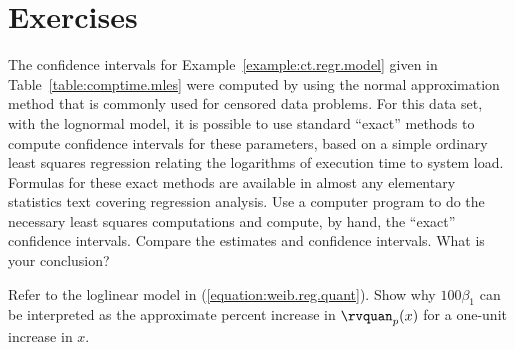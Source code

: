 \section*{Exercises}

\begin{exercise}
The confidence intervals for Example~\ref{example:ct.regr.model} given
in Table~\ref{table:comptime.mles} were computed by using the normal
approximation method that is commonly used for censored data problems.
For this data set, with the lognormal model, it is possible to use
standard ``exact'' methods to compute confidence intervals for these
parameters, based on a simple ordinary least squares regression
relating the logarithms of execution time to system load.  Formulas
for these exact methods are available in almost any elementary
statistics text covering regression analysis.  Use a computer program
to do the necessary least squares computations and compute, by hand,
the ``exact'' confidence intervals.  Compare the estimates and
confidence intervals. What is your conclusion?
\end{exercise}

\begin{exercise}
Refer to the loglinear model in (\ref{equation:weib.reg.quant}).
Show why $100\beta_{1}$ can be interpreted as the approximate percent increase
in $\rvquan_{p}(x)$ for a one-unit increase in $x$.
\end{exercise}

